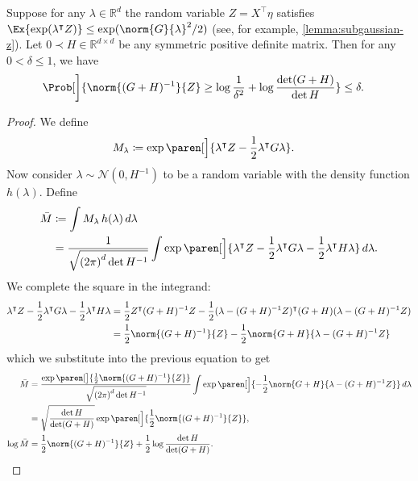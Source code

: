 \documentclass{article}
\newcommand{\defeq}{\coloneq}
\newcommand{\inv}[1]{#1^{-1}}
\newcommand{\Real}{\mathds{R}}
\DeclarePairedDelimiter{\paren}()
\newcommand{\transp}[1]{#1^\intercal}
\begin{document}
\begin{lemma}
  Suppose for any $\lambda\in\Real^d$ the random variable
  $Z=\transp{X}\eta$ satisfies
  $\Ex{\exp(\transp{\lambda}Z)} \le \exp(\norm{G}{\lambda}^2/2)$ (see,
  for example, \cref{lemma:subgaussian-z}).  Let
  $0 \prec H \in \Real^{d\times d}$ be any symmetric positive definite
  matrix.  Then for any $0 < \delta \le 1$, we have
  \begin{align*}
    \Prob[\bigg]{\norm{\inv{(G+H)}}{Z} \ge \log\frac{1}{\delta^2} + \log\frac{\det(G+H)}{\det H}} &\le \delta.
  \end{align*}

  \begin{proof}
    We define
    \begin{align*}
      M_\lambda &\defeq \exp\paren[\Big]{\transp{\lambda}Z - \frac{1}{2}\transp{\lambda}G\lambda}.
    \end{align*}
    Now consider $\lambda\sim\mathcal{N}(0, \inv{H})$ to be a random
    variable with the density function $h(\lambda)$.  Define
    \begin{align*}
      \bar{M}
      &\defeq \int M_\lambda \,h(\lambda)\,d\lambda \\
      &= \frac{1}{\sqrt{{(2\pi)}^d \det\inv{H}}} \int\exp\paren[\Big]{\transp{\lambda}Z
        - \frac{1}{2}\transp{\lambda}G\lambda
        - \frac{1}{2}\transp{\lambda}H\lambda
        } \,d\lambda.
    \end{align*}
    We complete the square in the integrand:
    \begin{align*}
      \transp{\lambda}Z - \frac{1}{2}\transp{\lambda}G\lambda - \frac{1}{2}\transp{\lambda}H\lambda
      &= \frac{1}{2}\transp{Z}\inv{(G+H)}Z - \frac{1}{2}\transp{(\lambda - \inv{(G+H)}Z)}(G+H)(\lambda-\inv{(G+H)}Z) \\
      &= \frac{1}{2} \norm{\inv{(G+H)}}{Z} - \frac{1}{2}\norm{G+H}{\lambda-\inv{(G+H)}Z}
    \end{align*}
    which we substitute into the previous equation to get
    \begin{align*}
      \bar{M}
      &= \frac{\exp\paren[\big]{\frac{1}{2} \norm{\inv{(G+H)}}{Z}}}{\sqrt{{(2\pi)}^d \det\inv{H}}}
        \int \exp\paren[\Big]{-\frac{1}{2} \norm{G+H}{\lambda-\inv{(G+H)}Z}} \,d\lambda \\
      &= \sqrt{\frac{\det H}{\det(G+H)}} \exp\paren[\Big]{\frac{1}{2}\norm{\inv{(G+H)}}{Z}}, \\
      \log\bar{M} &= \frac{1}{2}\norm{\inv{(G+H)}}{Z} + \frac{1}{2}\log\frac{\det H}{\det(G+H)}.
    \end{align*}

\end{proof}
\end{lemma}
\end{document}
